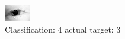 \begin{figure}[h!]
\begin{center}
\includegraphics[width=0.60\columnwidth]{figures/ID140_class_4_target_3.png}
\end{center}
\caption{ Classification: 4 actual target: 3}
\label{fig:ID140_class_4_target_3}
\end{figure}
